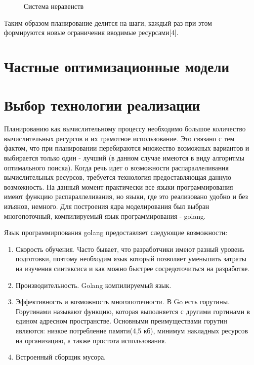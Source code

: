 \begin{figure}[H]
    \caption{Система неравенств}
    \label{ris:sys1}
\end{figure}

Таким образом планирование делится на шаги, каждый раз при этом формируются новые ограничения вводимые ресурсами[4].


\section{Частные оптимизационные модели}

\section{Выбор технологии реализации}

Планированию как вычислительному процессу необходимо большое количество вычислительных ресурсов и их грамотное использование. Это связано с тем фактом, что при планировании перебираются множество возможных вариантов и выбирается только один - лучший (в данном случае имеются в виду алгоритмы оптимального поиска). Когда речь идет о возможности распараллеливания вычислительных ресурсов, требуется технология предоставляющая данную возможность. На данный момент практически все языки программирования имеют функцию распараллеливания, но языки, где это реализовано удобно и без изъянов, немного.  Для построения ядра моделирования был выбран многопоточный, компилируемый язык программирования - golang.

Язык программирпования golang предоставляет следующие возможности:

\begin{enumerate}
    \item Скорость обучения. Часто бывает, что разработчики имеют разный уровень подготовки, поэтому необходим язык который позволяет уменьшить затраты на изучения синтаксиса и как можно быстрее сосредоточиться на разработке. 
    \item Производительность. Golang компилируемый язык. 
    \item Эффективность и возможность многопоточности. В Go есть горутины. Горутинами называют функцию, которая выполняется с другими гортинами в едином адресном пространстве. Основными преимуществами горутин являются: низкое потребление памяти(4,5 кб), минимум накладных ресурсов на организацию, а также простота использования.
    \item Встроенный сборщик мусора.
\end{enumerate}

